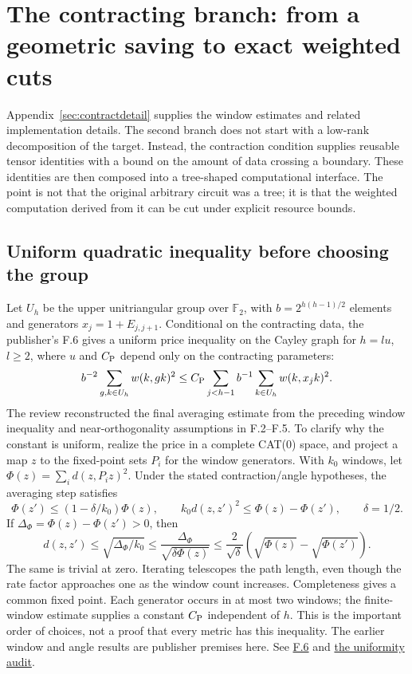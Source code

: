 \documentclass[11pt,letterpaper]{article}
\theoremstyle{definition}\newtheorem{definition}[theorem]{Definition}\newtheorem{example}[theorem]{Example}
\theoremstyle{remark}\newtheorem{remark}[theorem]{Remark}
\newcommand{\F}{\mathbb{F}}
\newcommand{\pub}[3]{\href{https://github.com/anthropics/formal-math/blob/11b6c7e3c927df2658f513b6b68ea7f8929c62c5/vp-vnp/#1\#L#2}{#3}}
\newcommand{\aud}[2]{\href{https://github.com/nousentllc/VP-VNP-Review/blob/567303d0bcf4f9d54390437b137752446e58ccd6/#1}{#2}}
\begin{document}
\section{The contracting branch: from a geometric saving to exact weighted cuts}\label{sec:contract}
Appendix~\ref{sec:contractdetail} supplies the window estimates and related implementation details.
The second branch does not start with a low-rank decomposition of the target. Instead, the contraction condition supplies reusable tensor identities with a bound on the amount of data crossing a boundary. These identities are then composed into a tree-shaped computational interface. The point is not that the original arbitrary circuit was a tree; it is that the weighted computation derived from it can be cut under explicit resource bounds.

\subsection{Uniform quadratic inequality before choosing the group}\label{sec:groups}
Let $U_h$ be the upper unitriangular group over $\F_2$, with $b=2^{h(h-1)/2}$ elements and generators $x_j=1+E_{j,j+1}$. Conditional on the contracting data, the publisher's F.6 gives a uniform price inequality on the Cayley graph for $h=lu$, $l\ge2$, where $u$ and $C_{\rm P}$ depend only on the contracting parameters:
\[
 b^{-2}\sum_{g,k\in U_h}w(k,gk)^2
 \le C_{\rm P}\sum_{j<h-1}b^{-1}\sum_{k\in U_h}w(k,x_jk)^2.
\]
The review reconstructed the final averaging estimate from the preceding window inequality and near-orthogonality assumptions in F.2--F.5. To clarify why the constant is uniform, realize the price in a complete CAT(0) space, and project a map $z$ to the fixed-point sets $P_i$ for the window generators. With $k_0$ windows, let $\Phi(z)=\sum_i d(z,P_i z)^2$. Under the stated contraction/angle hypotheses, the averaging step satisfies
\[
 \Phi(z')\le(1-\delta/k_0)\Phi(z),\qquad
 k_0 d(z,z')^2\le\Phi(z)-\Phi(z'),\qquad \delta=1/2.
\]
If $\Delta_\Phi=\Phi(z)-\Phi(z')>0$, then
\[
 d(z,z')\le\sqrt{\Delta_\Phi/k_0}
 \le\frac{\Delta_\Phi}{\sqrt{\delta\Phi(z)}}
 \le\frac{2}{\sqrt\delta}(\sqrt{\Phi(z)}-\sqrt{\Phi(z')}).
\]
The same is trivial at zero. Iterating telescopes the path length, even though the rate factor approaches one as the window count increases. Completeness gives a common fixed point. Each generator occurs in at most two windows; the finite-window estimate supplies a constant $C_{\rm P}$ independent of $h$. This is the important order of choices, not a proof that every metric has this inequality. The earlier window and angle results are publisher premises here. See \pub{Paper/Groups.lean}{1085}{F.6} and \aud{passes/pass13B-gain.md}{the uniformity audit}.
\end{document}
